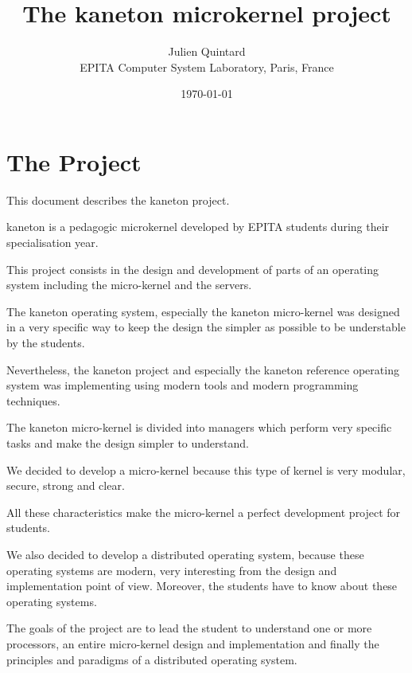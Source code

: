 \documentclass[10pt,a4wide]{article}
\title{The kaneton microkernel project}
\author{\small{Julien Quintard} \\
        \scriptsize{EPITA Computer System Laboratory, Paris, France}}
\date{\scriptsize{\today}}
\begin{document}
\maketitle


\begin{abstract}

\end{abstract}

%
%



\section{The Project}

This document describes the kaneton project.

kaneton is a pedagogic microkernel developed by EPITA students during
their specialisation year.

This project consists in the design and development of parts of an
operating system including the micro-kernel and the servers.

The kaneton operating system, especially the kaneton micro-kernel was
designed in a very specific way to keep the design the simpler as possible
to be understable by the students.

Nevertheless, the kaneton project and especially the kaneton reference
operating system was implementing using modern tools and modern
programming techniques.

The kaneton micro-kernel is divided into managers which perform very
specific tasks and make the design simpler to understand.

We decided to develop a micro-kernel because this type of kernel is very
modular, secure, strong and clear.

All these characteristics make the micro-kernel a perfect development
project for students.

We also decided to develop a distributed operating system, because these
operating systems are modern, very interesting from the design and
implementation point of view. Moreover, the students have to know about
these operating systems.

The goals of the project are to lead the student to understand one or more
processors, an entire micro-kernel design and implementation and finally
the principles and paradigms of a distributed operating system.
\end{document}
